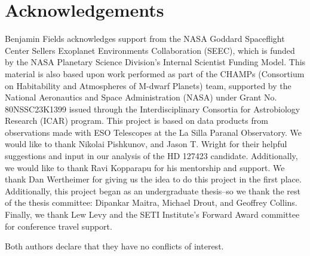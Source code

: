 \documentclass[twocolumn]{aastex701}
\begin{document}
\section{Acknowledgements}
Benjamin Fields acknowledges support from the NASA Goddard Spaceflight Center Sellers Exoplanet Environments Collaboration (SEEC), which is funded by the NASA Planetary Science Division's Internal Scientist Funding Model. This material is also based upon work performed as part of the CHAMPs (Consortium on Habitability and Atmospheres of M-dwarf Planets) team, supported by the National Aeronautics and Space Administration (NASA) under Grant No. 80NSSC23K1399 issued through the Interdisciplinary Consortia for Astrobiology Research (ICAR) program.  This project is based on data products from observations made with ESO Telescopes at the La Silla Paranal Observatory. We would like to thank Nikolai Pishkunov, and Jason T. Wright for their helpful suggestions and input in our analysis of the HD 127423 candidate. Additionally, we would like to thank Ravi Kopparapu for his mentorship and support. We thank Dan Wertheimer for giving us the idea to do this project in the first place. Additionally, this project began as an undergraduate thesis--so we thank the rest of the thesis committee: Dipankar Maitra, Michael Drout, and Geoffrey Collins. Finally, we thank Lew Levy and the SETI Institute's Forward Award committee for conference travel support.

Both authors declare that they have no conflicts of interest.
\clearpage
\onecolumngrid

\appendix
\end{document}

